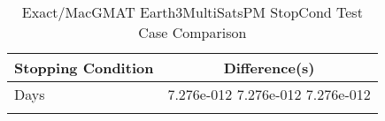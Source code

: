 \begin{table}[htbp!]
\centering
\caption{ Exact/MacGMAT Earth3MultiSatsPM StopCond Test Case Comparison}
      \begin{tabular}{lc}
      \hline\hline
          Stopping Condition & Difference(s) \\
         \hline
         Days &  7.276e-012 7.276e-012 7.276e-012 \\
      \hline\hline
      \label{Table: Exact-MacGMAT Earth3MultiSatsPM StopCond Table} 
\end{tabular}
\end{table}
